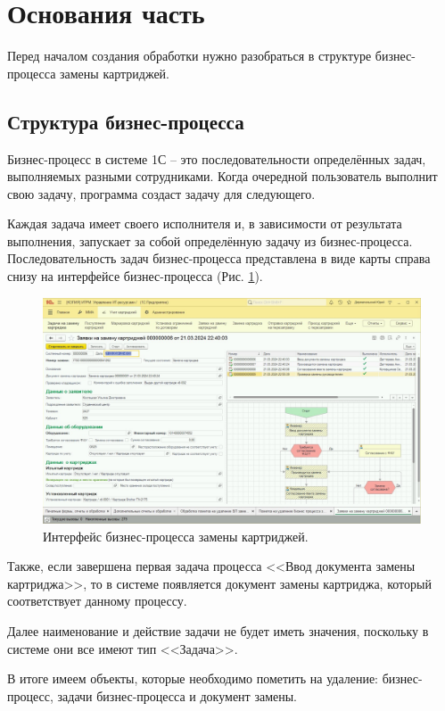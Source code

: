 \section{Основания часть}
    Перед началом создания обработки нужно разобраться в структуре бизнес-процесса замены картриджей.

    \subsection{Структура бизнес-процесса}
    Бизнес-процесс в системе 1С -- это последовательности определённых задач, выполняемых разными сотрудниками. Когда очередной пользователь выполнит свою задачу, программа создаст задачу для следующего.

    Каждая задача имеет своего исполнителя и, в зависимости от результата выполнения, запускает за собой определённую задачу из бизнес-процесса. Последовательность задач бизнес-процесса представлена в виде карты справа снизу на интерфейсе бизнес-процесса (Рис. \ref{process}).

    \begin{figure}[H]
        \centering
        \includegraphics[width=14cm]{pictures/process.png}
        \caption{Интерфейс бизнес-процесса замены картриджей.}  \label{process}
    \end{figure}

    Также, если завершена первая задача процесса <<Ввод документа замены картриджа>>, то в системе появляется документ замены картриджа, который соответствует данному процессу.

    Далее наименование и действие задачи не будет иметь значения, поскольку в системе они все имеют тип <<Задача>>.

    В итоге имеем объекты, которые необходимо пометить на удаление: бизнес-процесс, задачи бизнес-процесса и документ замены.


